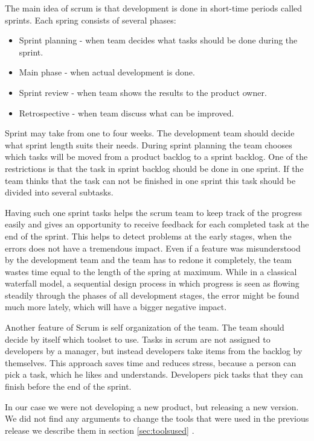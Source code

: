  The main idea of scrum is that development is done in short-time periods
  called sprints. Each spring consists of several phases:
  \begin{itemize}
    \item  Sprint planning - when team decides what tasks should be done during the
  sprint.
  \item   Main phase - when actual development is done.
  \item Sprint review - when team shows the results to the product owner.
  \item Retrospective - when team discuss what can be improved.
  \end{itemize}
 
  Sprint may take from one to four weeks. The development team should decide
  what sprint length suits their needs. During sprint planning the team chooses
  which tasks will be moved from a product backlog to a sprint backlog.
  One of the restrictions is that the task in sprint backlog should be done in one sprint.
  If the team thinks that the task can not be finished in one sprint this task
  should be divided into several subtasks. 
  
  Having such one sprint tasks helps the scrum team to keep track of the
  progress easily and gives an opportunity to receive feedback for each
  completed task at the end of the sprint. This helps to detect problems at the early stages, when
  the errors does not have a tremendous impact.
  Even if a feature was misunderstood by the development team
  and the team  has to redone it completely, the team wastes time equal to the
  length of the spring at maximum. While in a classical waterfall model,
   a sequential design process in which progress is seen as flowing steadily through 
   the phases of all development stages, 
  the error might be found much more lately, which will have a bigger negative impact.

  Another feature of Scrum is self organization of the team. The team should
  decide by itself which toolset to use. Tasks in scrum are not assigned to
  developers by a manager, but instead developers take items from the backlog by themselves.
  This approach saves time and reduces stress, because a person can pick a task,
  which he likes and understands. Developers pick tasks that they
  can finish before the end of the sprint.

  In our case we were not developing a new product, but releasing a new version.
  We did not find any arguments to change the tools that were used in the
  previous release we describe them in section \ref{sec:toolsused} .

